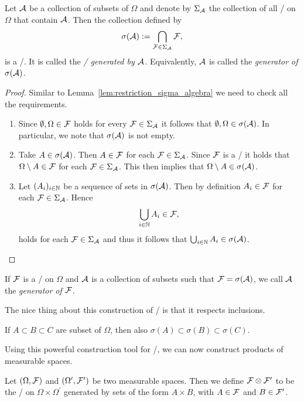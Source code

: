 \begin{proposition}
Let $\mathcal A$ be a collection of subsets of $\Omega$ and denote by $\Sigma_{\mathcal A}$ the collection of all \sigalgs/ on $\Omega$ that contain $\mathcal A$. Then the collection defined by
\[
	\sigma(\mathcal A) := \bigcap_{\mathcal F \in \Sigma_{\mathcal A}} \mathcal F,
\]
is a \sigalg/. It is called the \emph{\sigalg/ generated by $\mathcal A$}. Equivalently, $\mathcal A$ is called the \emph{generator of $\sigma(\mathcal A)$}. 
\end{proposition}

\begin{proof}
Similar to Lemma~\ref{lem:restriction_sigma_algebra} we need to check all the requirements.
\begin{enumerate}
\item Since $\emptyset, \Omega \in \mathcal F$ holds for every $\mathcal F \in \Sigma_{\mathcal A}$ it follows that $\emptyset, \Omega \in \sigma(\mathcal A)$. In particular, we note that $\sigma(\mathcal A)$ is not empty.
\item Take $A \in \sigma(\mathcal A)$. Then $A \in \mathcal F$ for each $\mathcal F \in \Sigma_{\mathcal A}$. Since $\mathcal F$ is a \sigalg/ it holds that $\Omega \setminus A \in \mathcal F$ for each $\mathcal F \in \Sigma_{\mathcal A}$. This then implies that $\Omega \setminus A \in \sigma(\mathcal A)$.
\item Let $(A_i)_{i \in \mathbb N}$ be a sequence of sets in $\sigma(\mathcal A)$. Then by definition $A_i \in \mathcal F$ for each $\mathcal F \in \Sigma_{\mathcal A}$. Hence
\[
	\bigcup_{i \in \mathbb N} A_i \in \mathcal F,
\] 
holds for each $\mathcal F \in \Sigma_{\mathcal A}$ and thus it follows that $\bigcup_{i \in \mathbb N} A_i \in \sigma(\mathcal A)$.
\end{enumerate}
\end{proof}

If $\mathcal F$ is a \sigalg/ on $\Omega$ and $\mathcal A$ is a collection of subsets such that $\mathcal F = \sigma(\mathcal A)$, we call $\mathcal A$ the \emph{generator of $\mathcal F$}. 

The nice thing about this construction of \sigalgs/ is that it respects inclusions.

\begin{lemma}
If $A \subset B \subset C$ are subset of $\Omega$, then also $\sigma(A) \subset \sigma(B) \subset \sigma(C)$.
\end{lemma}

Using this powerful construction tool for \sigalgs/, we can now construct products of measurable spaces.

\begin{definition}
Let $(\Omega, \mathcal F)$ and $(\Omega^\prime, \mathcal F^\prime)$ be two measurable spaces. Then we define $\mathcal F \otimes \mathcal F^\prime$ to be the \sigalg/ on $\Omega \times \Omega^\prime$ generated by sets of the form $A \times B$, with $A \in \mathcal F$ and $B \in \mathcal F^\prime$.
\end{definition}

